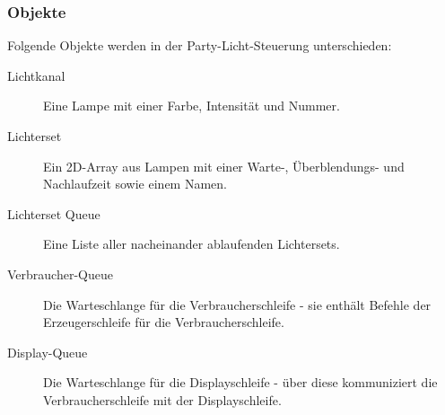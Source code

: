 \subsubsection{Objekte}
Folgende Objekte werden in der Party-Licht-Steuerung unterschieden:
\begin{description}
\item[Lichtkanal]Eine Lampe mit einer Farbe, Intensität und Nummer.
\item[Lichterset]Ein 2D-Array aus Lampen mit einer Warte-, Überblendungs- und Nachlaufzeit sowie einem Namen.
\item[Lichterset Queue] Eine Liste aller nacheinander ablaufenden Lichtersets.

\item[Verbraucher-Queue]Die Warteschlange für die Verbraucherschleife - sie enthält Befehle der Erzeugerschleife für die Verbraucherschleife. 



\item[Display-Queue]Die Warteschlange für die Displayschleife - über diese kommuniziert die Verbraucherschleife mit der Displayschleife. 

\end{description}


